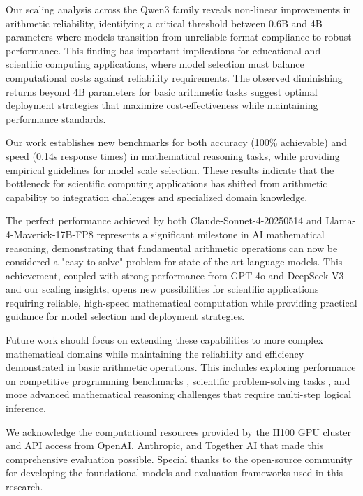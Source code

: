 \documentclass{article}
\begin{document}
Our scaling analysis across the Qwen3 family reveals non-linear improvements in arithmetic reliability, identifying a critical threshold between 0.6B and 4B parameters where models transition from unreliable format compliance to robust performance. This finding has important implications for educational and scientific computing applications, where model selection must balance computational costs against reliability requirements. The observed diminishing returns beyond 4B parameters for basic arithmetic tasks suggest optimal deployment strategies that maximize cost-effectiveness while maintaining performance standards.

Our work establishes new benchmarks for both accuracy (100\% achievable) and speed (0.14s response times) in mathematical reasoning tasks, while providing empirical guidelines for model scale selection. These results indicate that the bottleneck for scientific computing applications has shifted from arithmetic capability to integration challenges and specialized domain knowledge.

The perfect performance achieved by both Claude-Sonnet-4-20250514 and Llama-4-Maverick-17B-FP8 represents a significant milestone in AI mathematical reasoning, demonstrating that fundamental arithmetic operations can now be considered a "easy-to-solve" problem for state-of-the-art language models. This achievement, coupled with strong performance from GPT-4o and DeepSeek-V3 and our scaling insights, opens new possibilities for scientific applications requiring reliable, high-speed mathematical computation while providing practical guidance for model selection and deployment strategies.

Future work should focus on extending these capabilities to more complex mathematical domains while maintaining the reliability and efficiency demonstrated in basic arithmetic operations. This includes exploring performance on competitive programming benchmarks \citep{liang2024livecodebench}, scientific problem-solving tasks \citep{wang2023scibench}, and more advanced mathematical reasoning challenges that require multi-step logical inference.

\begin{ack}
We acknowledge the computational resources provided by the H100 GPU cluster and API access from OpenAI, Anthropic, and Together AI that made this comprehensive evaluation possible. Special thanks to the open-source community for developing the foundational models and evaluation frameworks used in this research.
\end{ack}
\end{document}
